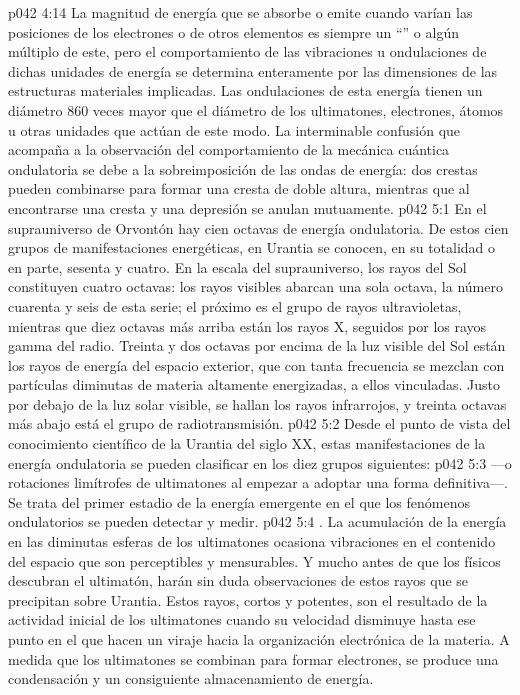 \vs p042 4:14 La magnitud de energía que se absorbe o emite cuando varían las posiciones de los electrones o de otros elementos es siempre un “” o algún múltiplo de este, pero el comportamiento de las vibraciones u ondulaciones de dichas unidades de energía se determina enteramente por las dimensiones de las estructuras materiales implicadas. Las ondulaciones de esta energía tienen un diámetro 860 veces mayor que el diámetro de los ultimatones, electrones, átomos u otras unidades que actúan de este modo. La interminable confusión que acompaña a la observación del comportamiento de la mecánica cuántica ondulatoria se debe a la sobreimposición de las ondas de energía: dos crestas pueden combinarse para formar una cresta de doble altura, mientras que al encontrarse una cresta y una depresión se anulan mutuamente.
\vs p042 5:1 En el suprauniverso de Orvontón hay cien octavas de energía ondulatoria. De estos cien grupos de manifestaciones energéticas, en Urantia se conocen, en su totalidad o en parte, sesenta y cuatro. En la escala del suprauniverso, los rayos del Sol constituyen cuatro octavas: los rayos visibles abarcan una sola octava, la número cuarenta y seis de esta serie; el próximo es el grupo de rayos ultravioletas, mientras que diez octavas más arriba están los rayos X, seguidos por los rayos gamma del radio. Treinta y dos octavas por encima de la luz visible del Sol están los rayos de energía del espacio exterior, que con tanta frecuencia se mezclan con partículas diminutas de materia altamente energizadas, a ellos vinculadas. Justo por debajo de la luz solar visible, se hallan los rayos infrarrojos, y treinta octavas más abajo está el grupo de radiotransmisión.
\vs p042 5:2 \pc Desde el punto de vista del conocimiento científico de la Urantia del siglo XX, estas manifestaciones de la energía ondulatoria se pueden clasificar en los diez grupos siguientes:
\vs p042 5:3  ---o rotaciones limítrofes de ultimatones al empezar a adoptar una forma definitiva---. Se trata del primer estadio de la energía emergente en el que los fenómenos ondulatorios se pueden detectar y medir.
\vs p042 5:4 . La acumulación de la energía en las diminutas esferas de los ultimatones ocasiona vibraciones en el contenido del espacio que son perceptibles y mensurables. Y mucho antes de que los físicos descubran el ultimatón, harán sin duda observaciones de estos rayos que se precipitan sobre Urantia. Estos rayos, cortos y potentes, son el resultado de la actividad inicial de los ultimatones cuando su velocidad disminuye hasta ese punto en el que hacen un viraje hacia la organización electrónica de la materia. A medida que los ultimatones se combinan para formar electrones, se produce una condensación y un consiguiente almacenamiento de energía.
